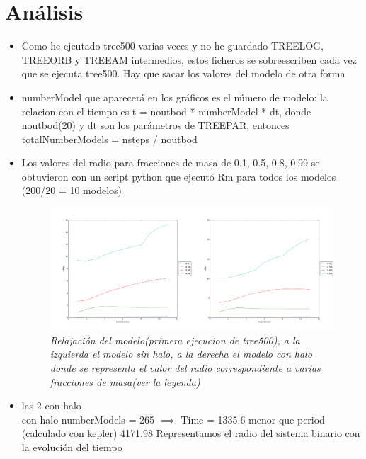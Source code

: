 \documentclass[12pt]{book}
\begin{document}
\section*{Análisis}
\begin{itemize}
\item Como he ejcutado tree500 varias veces y no he guardado TREELOG, TREEORB y TREEAM intermedios, estos ficheros se sobreescriben cada vez que se ejecuta tree500. Hay que sacar los valores del modelo de otra forma
\item numberModel que aparecerá en los gráficos es el número de modelo: la relacion con el tiempo es t = noutbod * numberModel * dt, donde noutbod(20) y dt son los parámetros de TREEPAR, entonces totalNumberModels = nsteps / noutbod
\item Los valores del radio para fracciones de masa de 0.1, 0.5, 0.8, 0.99 se obtuvieron con un script python que ejecutó Rm para todos los modelos (200/20 = 10 modelos)


\begin{figure}[!h]
 \centering
 \includegraphics[scale=0.2]{imgRad1.png}
 \caption{\emph{Relajación del modelo(primera ejecucion de tree500), a la izquierda el modelo sin halo, a la derecha el modelo con halo\\
	donde se representa el valor del radio correspondiente a varias fracciones de masa(ver la leyenda)
}}
 \label{Fig: 1}
\end{figure}

\item las 2 con halo\\
con halo numberModels = 265  $\implies$ Time = 1335.6 menor que period (calculado con kepler) 4171.98
Representamos el radio del sistema binario con la evolución del tiempo



\end{itemize}
\end{document}
